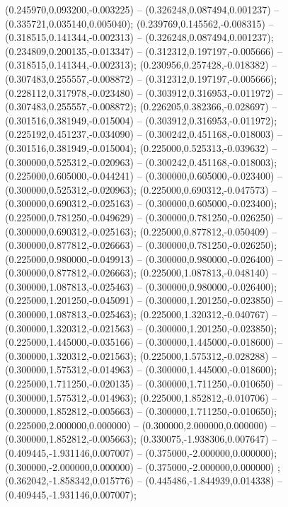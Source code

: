  (0.245970,0.093200,-0.003225) -- (0.326248,0.087494,0.001237) -- (0.335721,0.035140,0.005040);
 (0.239769,0.145562,-0.008315) -- (0.318515,0.141344,-0.002313) -- (0.326248,0.087494,0.001237);
 (0.234809,0.200135,-0.013347) -- (0.312312,0.197197,-0.005666) -- (0.318515,0.141344,-0.002313);
 (0.230956,0.257428,-0.018382) -- (0.307483,0.255557,-0.008872) -- (0.312312,0.197197,-0.005666);
 (0.228112,0.317978,-0.023480) -- (0.303912,0.316953,-0.011972) -- (0.307483,0.255557,-0.008872);
 (0.226205,0.382366,-0.028697) -- (0.301516,0.381949,-0.015004) -- (0.303912,0.316953,-0.011972);
 (0.225192,0.451237,-0.034090) -- (0.300242,0.451168,-0.018003) -- (0.301516,0.381949,-0.015004);
 (0.225000,0.525313,-0.039632) -- (0.300000,0.525312,-0.020963) -- (0.300242,0.451168,-0.018003);
 (0.225000,0.605000,-0.044241) -- (0.300000,0.605000,-0.023400) -- (0.300000,0.525312,-0.020963);
 (0.225000,0.690312,-0.047573) -- (0.300000,0.690312,-0.025163) -- (0.300000,0.605000,-0.023400);
 (0.225000,0.781250,-0.049629) -- (0.300000,0.781250,-0.026250) -- (0.300000,0.690312,-0.025163);
 (0.225000,0.877812,-0.050409) -- (0.300000,0.877812,-0.026663) -- (0.300000,0.781250,-0.026250);
 (0.225000,0.980000,-0.049913) -- (0.300000,0.980000,-0.026400) -- (0.300000,0.877812,-0.026663);
 (0.225000,1.087813,-0.048140) -- (0.300000,1.087813,-0.025463) -- (0.300000,0.980000,-0.026400);
 (0.225000,1.201250,-0.045091) -- (0.300000,1.201250,-0.023850) -- (0.300000,1.087813,-0.025463);
 (0.225000,1.320312,-0.040767) -- (0.300000,1.320312,-0.021563) -- (0.300000,1.201250,-0.023850);
 (0.225000,1.445000,-0.035166) -- (0.300000,1.445000,-0.018600) -- (0.300000,1.320312,-0.021563);
 (0.225000,1.575312,-0.028288) -- (0.300000,1.575312,-0.014963) -- (0.300000,1.445000,-0.018600);
 (0.225000,1.711250,-0.020135) -- (0.300000,1.711250,-0.010650) -- (0.300000,1.575312,-0.014963);
 (0.225000,1.852812,-0.010706) -- (0.300000,1.852812,-0.005663) -- (0.300000,1.711250,-0.010650);
 (0.225000,2.000000,0.000000) -- (0.300000,2.000000,0.000000) -- (0.300000,1.852812,-0.005663);
 (0.330075,-1.938306,0.007647) -- (0.409445,-1.931146,0.007007) -- (0.375000,-2.000000,0.000000);
 (0.300000,-2.000000,0.000000) -- (0.375000,-2.000000,0.000000) ;
 (0.362042,-1.858342,0.015776) -- (0.445486,-1.844939,0.014338) -- (0.409445,-1.931146,0.007007);
